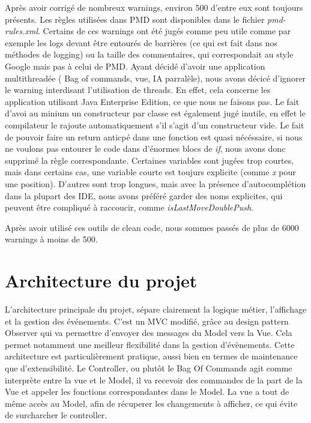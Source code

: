 \documentclass{article}
\begin{document}
Après avoir corrigé de nombreux warnings, environ 500 d'entre eux sont toujours présents.
Les règles utilisées dans PMD sont disponibles dans le fichier \textit{pmd-rules.xml}.
Certains de ces warnings ont été jugés 
comme peu utile comme par exemple les logs devant être entourés de barrières (ce qui est fait dans nos méthodes de logging) ou la taille des commentaires,
qui correspondait au style Google mais pas à celui de PMD. 
Ayant décidé d'avoir une application multithreadée ( Bag of commands, vue, IA parralèle), nous avons décicé d'ignorer le warning interdisant l'utilisation de threads.
En effet, cela concerne les application utilisant Java Enterprise Edition, ce que nous ne faisons pas.
Le fait d'avoi au minium un constructeur par classe est également jugé inutile, en effet le compilateur le rajoute automatiquement s'il s'agit d'un constructeur vide.
Le fait de pouvoir faire un return anticpé dans une fonction est quasi nécéssaire, si nous ne voulons pas entourer le code dans 
d'énormes blocs de \textit{if}, nous avons donc supprimé la règle correspondante.
Certaines variables sont jugées trop courtes, mais dans certains cas, une variable courte est toujurs explicite (comme \textit{x} pour une position). 
D'autres sont trop longues, mais avec la présence d'autocomplétion dans la plupart des IDE, nous avons préféré garder des noms explicites, qui peuvent être compliqué à raccoucir,
comme \textit{isLastMoveDoublePush}.

Après avoir utilisé ces outils de clean code, nous sommes passés de plus de 6000 warnings à moins de 500.

\section{Architecture du projet}
L'architecture principale du projet, sépare clairement la logique métier, l'affichage et la gestion des événements. C'est un MVC modifié,
grâce au design pattern Observer qui va permettre d'envoyer des messages du Model vers la Vue. Cela permet notamment une meilleur flexibilité dans la
gestion d'évènements.
Cette architecture est particulièrement pratique, aussi bien en termes de maintenance que d'extensibilité.
Le Controller, ou plutôt le Bag Of Commands agit comme interprète entre la vue et le Model, il va recevoir des commandes de la part de la Vue et appeler les fonctions correspondantes dans le Model.
La vue a tout de même accès au Model, afin de récuperer les changements à afficher, ce qui évite de surcharcher le controller.
\end{document}
